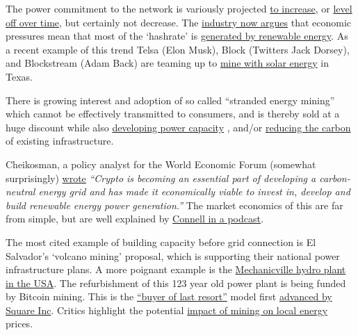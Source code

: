The power commitment to the network is variously projected \href{https://www.nature.com/articles/s41558-018-0321-8}{to increase}, or \href{https://assets.website-files.com/614e11526f6630959fc98679/616df63a27a7ec339f5e6a80_NYDIG-BitcoinNetZero_SML.pdf}{level off over time}, but certainly not decrease. The \href{https://www.forbes.com/sites/martinrivers/2022/04/03/is-bitcoin-really-that-bad-for-the-environment/?sh=6a3203427143}{industry now argues} that economic pressures mean that most of the `hashrate' is \href{https://bitcoinminingcouncil.com/q4-bitcoin-mining-council-survey-confirms-sustainable-power-mix-and-technological-efficiency/}{generated by renewable energy}\cite{blandin20203rd}. As a recent example of this trend Telsa (Elon Musk), Block (Twitters Jack Dorsey), and Blockstream (Adam Back) are teaming up to \href{https://www.cnbc.com/2022/04/08/tesla-block-blockstream-to-mine-bitcoin-off-solar-power-in-texas.html}{mine with solar energy} in Texas.\par 
There is growing interest and adoption of so called ``stranded energy mining''  which cannot be effectively transmitted to consumers, and is thereby sold at a huge discount while also \href{https://www.renewableenergyworld.com/wind-power/900mw-wind-farm-to-power-bitcoin-mining-operation/}{developing power capacity} \cite{bastian2021hedging}, and/or \href{https://www.bloomberg.com/news/articles/2022-03-24/exxon-considers-taking-gas-to-bitcoin-pilot-to-four-countries}{reducing the carbon} of existing infrastructure. \par%
Cheikosman, a policy analyst for the World Economic Forum (somewhat surprisingly) \href{https://www.weforum.org/agenda/2022/03/crypto-energy-consumption/?}{wrote} \textit{``Crypto is becoming an essential part of developing a carbon-neutral energy grid and has made it economically viable to invest in, develop and build renewable energy power generation.''} 
The market economics of this are far from simple, but are well explained by \href{https://www.whatbitcoindid.com/podcast/bitcoin-energy-markets}{Connell in a podcast}.\par
The most cited example of building capacity before grid connection is El Salvador's `volcano mining' proposal, which is supporting their national power infrastructure plans. A more poignant example is the \href{https://www.timesunion.com/news/article/Mechanicville-hydro-plant-gets-new-life-16299115.php}{Mechanicville hydro plant in the USA}. The refurbishment of this 123 year old power plant is being funded by Bitcoin mining. This is the \href{https://www.lynalden.com/bitcoin-energy/}{``buyer of last resort''} model first \href{https://squareup.com/us/en/press/bcei-white-paper}{advanced by Square Inc}. Critics highlight the potential \href{https://www.fitchratings.com/research/us-public-finance/crypto-mining-poses-challenges-to-public-power-utilities-24-01-2022}{impact of mining on local energy} prices\cite{benetton2021cryptomining}.\par
